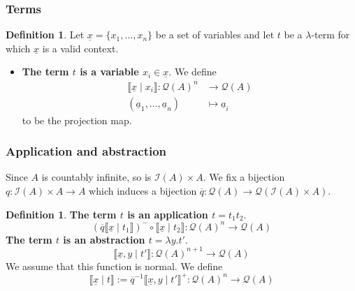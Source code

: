 \documentclass{beamer}
\theoremstyle{plain}
\theoremstyle{definition}
\newtheorem{defn}[thm]{Definition} %
\newcommand{\call}[1]{\mathcal{#1}}
\newcommand{\lto}{\longrightarrow}
\begin{document}
\begin{frame}
\frametitle{Terms}
\begin{defn}
		Let $\underline{x} = \{ x_1, \ldots, x_n \}$ be a set of variables and let $t$ be a $\lambda$-term for which $\underline{x}$ is a valid context.
		\begin{itemize}
			\item \textbf{The term $t$ is a variable $x_i \in \underline{x}$}. We define
			\begin{align*}
				\llbracket \underline{x} \mid x_i \rrbracket: \call{Q}(A)^n &\lto \call{Q}(A)\\
				(\underline{a}_1, \ldots, \underline{a}_n) &\longmapsto \underline{a}_i
			\end{align*}
			to be the projection map.
		\end{itemize}
	\end{defn}
\end{frame}

\begin{frame}
\frametitle{Application and abstraction}
Since $A$ is countably infinite, so is $\call{I}(A) \times A$. We fix a bijection $q: \call{I}(A) \times A \lto A$ which induces a bijection $\overline{q}: \call{Q}(A) \lto \call{Q}(\call{I}(A)\times A)$.
\begin{defn}
\textbf{The term $t$ is an application $t = t_1 t_2$}.
			\begin{equation*}
				(\overline{q} \llbracket \underline{x} \mid t_1 \rrbracket)^- \circ \llbracket \underline{x} \mid t_2 \rrbracket: \call{Q}(A)^n \lto \call{Q}(A)
			\end{equation*}
			\textbf{The term $t$ is an abstraction $t = \lambda y. t'$}.
			\begin{equation*}
				\llbracket \underline{x}, y \mid t' \rrbracket: \call{Q}(A)^{n+1} \lto \call{Q}(A)
			\end{equation*}
			We assume that this function is normal. We define
			\begin{equation*}
				\llbracket \underline{x} \mid t \rrbracket := \overline{q}^{-1} \llbracket \underline{x}, y \mid t' \rrbracket^+: \call{Q}(A)^n \lto \call{Q}(A)
			\end{equation*}
		\end{defn}
\end{frame}
\end{document}
